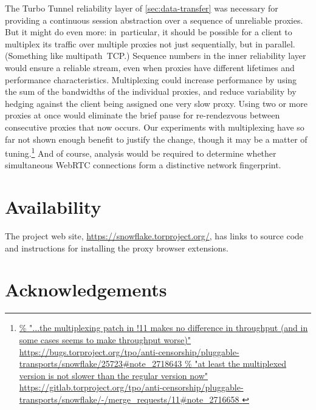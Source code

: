 \documentclass[letterpaper,twocolumn]{article}
\newlength{\urlfootnotesize}
\newcommand{\urlfootnote}[1]{\footnote{
\raggedright\fontsize{\urlfootnotesize}{\urlfootnotesize}\selectfont\url{#1}
}}
\begin{document}
The Turbo Tunnel reliability layer of \autoref{sec:data-transfer}
was necessary for providing a continuous session abstraction
over a sequence of unreliable proxies.
But it might do even more:
in~particular, it should be possible
for a client to multiplex its traffic
over multiple proxies not just sequentially, but in parallel.
(Something like multipath~TCP.)
Sequence numbers in the inner reliability layer
would ensure a reliable stream, even when proxies
have different lifetimes and performance characteristics.
Multiplexing could increase performance by using the sum
of the bandwidths of the individual proxies,
and reduce variability by hedging against the
client being assigned one very slow proxy.
Using two or more proxies at once would
eliminate the brief pause for re-rendezvous
between consecutive proxies that now occurs.
Our experiments with multiplexing have so far
not shown enough benefit to justify the change,
though it may be a matter of tuning.\urlfootnote{
https://bugs.torproject.org/tpo/anti-censorship/pluggable-transports/snowflake/25723\#note_2718643
}
And of course, analysis would be required
to determine whether simultaneous WebRTC connections
form a distinctive network fingerprint.


\section*{Availability}

The project web site,
\url{https://snowflake.torproject.org/},
has links to source code
and instructions for installing the proxy browser extensions.

\section*{Acknowledgements}
\end{document}
